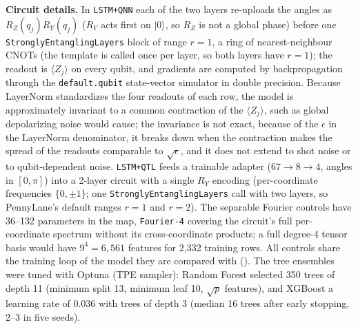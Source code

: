 \documentclass[11pt,a4paper]{article}
\begin{document}
\textbf{Circuit details.} In \texttt{LSTM+QNN} each of the two layers re-uploads the angles as $R_Z(q_j)R_Y(q_j)$ ($R_Y$ acts first on $|0\rangle$, so $R_Z$ is not a global phase) before one \texttt{StronglyEntanglingLayers} block of range $r=1$, a ring of nearest-neighbour CNOTs (the template is called once per layer, so both layers have $r=1$); the readout is $\langle Z_j\rangle$ on every qubit, and gradients are computed by backpropagation through the \texttt{default.qubit} state-vector simulator in double precision. Because LayerNorm standardizes the four readouts of each row, the model is approximately invariant to a common contraction of the $\langle Z_j\rangle$, such as global depolarizing noise would cause; the invariance is not exact, because of the $\epsilon$ in the LayerNorm denominator, it breaks down when the contraction makes the spread of the readouts comparable to $\sqrt{\epsilon}$, and it does not extend to shot noise or to qubit-dependent noise. \texttt{LSTM+QTL} feeds a trainable adapter ($67\to8\to4$, angles in $[0,\pi]$) into a 2-layer circuit with a single $R_Y$ encoding (per-coordinate frequencies $\{0,\pm1\}$; one \texttt{StronglyEntanglingLayers} call with two layers, so PennyLane's default ranges $r=1$ and $r=2$). The separable Fourier controls have 36--132 parameters in the map, \texttt{Fourier-4} covering the circuit's full per-coordinate spectrum without its cross-coordinate products; a full degree-4 tensor basis would have $9^4=6{,}561$ features for 2{,}332 training rows. All controls share the training loop of the model they are compared with (). The tree ensembles were tuned with Optuna (TPE sampler): Random Forest selected 350 trees of depth 11 (minimum split 13, minimum leaf 10, $\sqrt{p}$ features), and XGBoost a learning rate of 0.036 with trees of depth 3 (median 16 trees after early stopping, 2--3 in five seeds).
\end{document}
